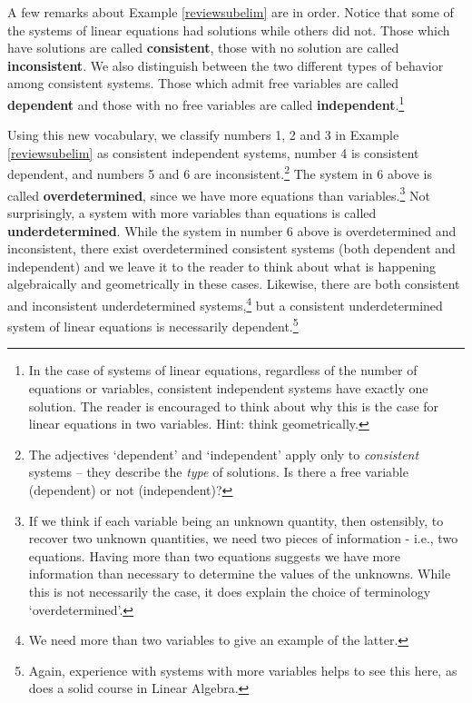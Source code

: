 \documentclass{ximera}
\begin{document}
A few remarks about Example \ref{reviewsubelim} are in order.  Notice that some of the systems of linear equations had solutions while others did not.  Those which have solutions are called \textbf{consistent}, those with no solution are called \textbf{inconsistent}.  We also distinguish between the two different types of behavior among consistent systems. Those which admit free variables are called \textbf{dependent} and those with no free variables are called \textbf{independent}.\footnote{In the case of systems of linear equations, regardless of the number of equations or variables, consistent independent systems have exactly one solution.  The reader is encouraged to think about why this is the case for linear equations in two variables.  Hint: think geometrically.}   

\medskip

Using this new vocabulary, we classify numbers 1, 2 and 3 in Example \ref{reviewsubelim} as consistent independent systems, number 4 is consistent dependent, and numbers 5 and 6 are inconsistent.\footnote{The adjectives `dependent' and `independent' apply only to \textit{consistent} systems -- they describe the \textit{type} of solutions.  Is there a free variable (dependent) or not (independent)?}  The system in 6 above is called \textbf{overdetermined}, since we have more equations  than variables.\footnote{If we think if each variable being an unknown quantity, then ostensibly, to recover two unknown quantities, we need two pieces of information - i.e., two equations.  Having more than two equations suggests we have more information than necessary to determine the values of the unknowns.  While this is not necessarily the case, it does explain the choice of terminology `overdetermined'.}  Not surprisingly, a system with more variables than equations is called \textbf{underdetermined}.  While the system in number 6 above is overdetermined and inconsistent, there exist overdetermined consistent systems (both dependent and independent) and we leave it to the reader to think about what is happening algebraically and geometrically in these cases.  Likewise, there are both consistent and inconsistent underdetermined systems,\footnote{We need more than two variables to give an example of the latter.} but a consistent underdetermined system of linear equations is necessarily dependent.\footnote{Again, experience with systems with more variables helps to see this here, as does a solid course in Linear Algebra.}  
\end{document}
